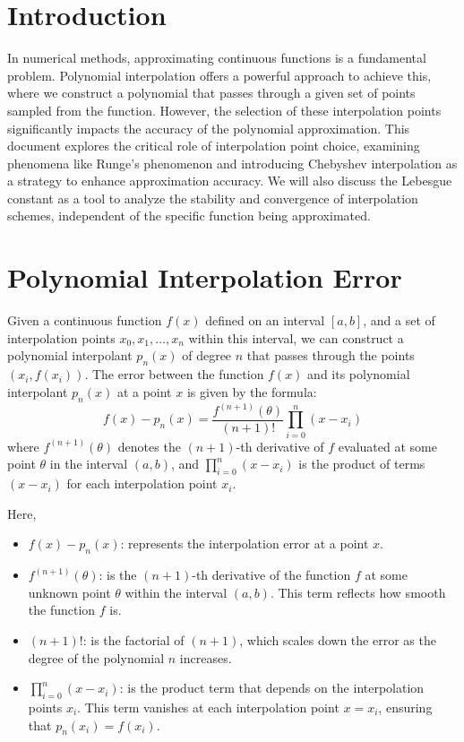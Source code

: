 \documentclass{article}
\begin{document}
\sloppy

\section{Introduction}

In numerical methods, approximating continuous functions is a fundamental problem. Polynomial interpolation offers a powerful approach to achieve this, where we construct a polynomial that passes through a given set of points sampled from the function.  However, the selection of these interpolation points significantly impacts the accuracy of the polynomial approximation. This document explores the critical role of interpolation point choice, examining phenomena like Runge's phenomenon and introducing Chebyshev interpolation as a strategy to enhance approximation accuracy. We will also discuss the Lebesgue constant as a tool to analyze the stability and convergence of interpolation schemes, independent of the specific function being approximated.

\section{Polynomial Interpolation Error}

Given a continuous function $f(x)$ defined on an interval $[a, b]$, and a set of interpolation points $x_0, x_1, \dots, x_n$ within this interval, we can construct a polynomial interpolant $p_n(x)$ of degree $n$ that passes through the points $(x_i, f(x_i))$. The error between the function $f(x)$ and its polynomial interpolant $p_n(x)$ at a point $x$ is given by the formula:
\[
f(x) - p_n(x) = \frac{f^{(n+1)}(\theta)}{(n+1)!} \prod_{i=0}^{n} (x - x_i)
\]
where $f^{(n+1)}(\theta)$ denotes the $(n+1)$-th derivative of $f$ evaluated at some point $\theta$ in the interval $(a, b)$, and $\prod_{i=0}^{n} (x - x_i)$ is the product of terms $(x - x_i)$ for each interpolation point $x_i$.

Here,
\begin{itemize}
    \item $f(x) - p_n(x)$: represents the interpolation error at a point $x$.
    \item $f^{(n+1)}(\theta)$: is the $(n+1)$-th derivative of the function $f$ at some unknown point $\theta$ within the interval $(a,b)$.  This term reflects how smooth the function $f$ is.
    \item $(n+1)!$: is the factorial of $(n+1)$, which scales down the error as the degree of the polynomial $n$ increases.
    \item $\prod_{i=0}^{n} (x - x_i)$: is the product term that depends on the interpolation points $x_i$. This term vanishes at each interpolation point $x = x_i$, ensuring that $p_n(x_i) = f(x_i)$.
\end{itemize}
\end{document}
